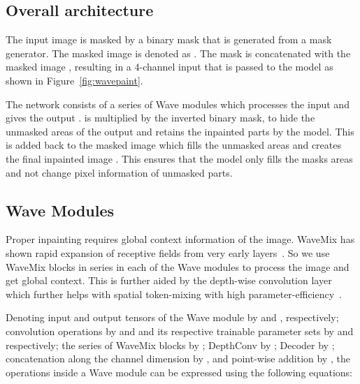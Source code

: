 \documentclass{article}
\begin{document}
\subsection{Overall architecture}

The input image  is masked by a binary mask  that is generated from a mask generator. The masked image is denoted as . The mask  is concatenated with the masked image , resulting in a 4-channel input  that is passed to the model as shown in Figure~\ref{fig:wavepaint}.

The network consists of a series of  Wave modules which processes the input  and gives the output .  is multiplied by the inverted binary mask,  to hide the unmasked areas of the output and retains the inpainted parts by the model. This is added back to the masked image  which fills the unmasked areas and creates the final inpainted image . This ensures that the model only fills the masks areas and not change pixel information of unmasked parts.

\subsection{Wave Modules}

Proper inpainting requires global context information of the image. WaveMix has shown rapid expansion of receptive fields from very early layers~\cite{jeevan2023wavemix}. So we use  WaveMix blocks in series in each of the Wave modules to process the image and get global context. This is further aided by the depth-wise convolution layer which further helps with spatial token-mixing with high parameter-efficiency~\cite{trockman2022patches}. 


Denoting input and output tensors of the Wave module by  and , respectively; convolution operations by  and  and its respective trainable parameter sets by  and  respectively;  the series of WaveMix blocks by ; DepthConv by ; Decoder by ;  concatenation along the channel dimension by , and point-wise addition by , the operations inside a Wave module can be expressed using the following equations:
\end{document}

